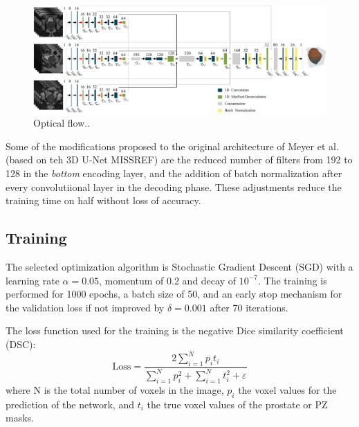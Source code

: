 \begin{figure}[h]
    \centering
    \includegraphics[totalheight=.3\textheight]{imgs/methodology/NN.png}
    \caption{Optical flow..}
    \label{fig:nn}
\end{figure}

Some of the modifications proposed to the original architecture of Meyer et al. \cite{anneke} 
(based on teh 3D U-Net MISSREF)
are the reduced number of filters from 192 to 128 in the \emph{bottom} encoding layer, and
the addition of batch normalization after every convolutiional layer 
in the decoding phase. These adjustments reduce the training time on half without
loss of accuracy. 

\subsection{Training}
\label{subsec:training}
The selected optimization algorithm is Stochastic Gradient Descent (SGD) with a
learning rate $\alpha = 0.05$, momentum of 0.2 and decay of $10^{-7}$. The training is performed
for 1000 epochs, a batch size of 50, and an early stop mechanism for the validation
loss if not improved by $\delta = 0.001$ after 70 iterations. 

The loss function used for the training is the negative Dice similarity coefficient (DSC):
\begin{equation}
\text{Loss} = \frac{2 \sum_{i=1}^{N}p_it_i}{\sum_{i=1}^{N}p_i^2 + \sum_{i=1}^{N}t_i^2 + \varepsilon} 
\label{eq:dsc}
\end{equation}
where N is the total number of voxels in the image, $p_i$ the voxel values for the 
prediction of the network, and $t_i$ the true voxel values of the prostate or PZ masks.

